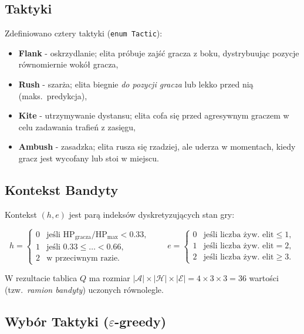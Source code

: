 \subsection{Taktyki}

Zdefiniowano cztery taktyki (\texttt{enum Tactic}):
\begin{itemize}
    \item \textbf{Flank} - oskrzydlanie; elita próbuje zajść gracza z boku, dystrybuując pozycje równomiernie wokół gracza,
    \item \textbf{Rush} - szarża; elita biegnie \emph{do pozycji gracza} lub lekko przed nią (maks.\ predykcja),
    \item \textbf{Kite} - utrzymywanie dystansu; elita cofa się przed agresywnym graczem w celu zadawania trafień z zasięgu,
    \item \textbf{Ambush} - zasadzka; elita rusza się rzadziej, ale uderza w momentach, kiedy gracz jest wycofany lub stoi w miejscu.
\end{itemize}

\subsection{Kontekst Bandyty}

Kontekst $(h, e)$ jest parą indeksów dyskretyzujących stan gry:

\[
    h = \begin{cases}
        0 & \text{jeśli } \text{HP}_\text{gracza} / \text{HP}_\text{max} < 0.33, \\
        1 & \text{jeśli } 0.33 \le \dots < 0.66, \\
        2 & \text{w przeciwnym razie}.
    \end{cases}
\qquad
    e = \begin{cases}
        0 & \text{jeśli liczba żyw.\ elit} \le 1, \\
        1 & \text{jeśli liczba żyw.\ elit} = 2, \\
        2 & \text{jeśli liczba żyw.\ elit} \ge 3.
    \end{cases}
\]

W rezultacie tablica $Q$ ma rozmiar $|\mathcal{A}| \times |\mathcal{H}| \times |\mathcal{E}| = 4 \times 3 \times 3 = 36$ wartości (tzw.\ \emph{ramion bandyty}) uczonych równolegle.

\subsection{Wybór Taktyki ($\varepsilon$-greedy)}

